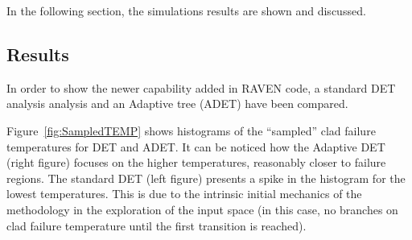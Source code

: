 In the following section, the simulations results are shown and discussed.
\subsection{Results}
In order to show the newer capability added in RAVEN code, a standard DET~\cite{alfonsiPSA,DETmilestone2013} analysis analysis and an Adaptive tree (ADET) have been compared.

Figure~\ref{fig:SampledTEMP} shows histograms of the “sampled” clad failure temperatures for DET and ADET. It can be noticed how the Adaptive DET (right figure) focuses on the higher temperatures, reasonably closer to failure regions. The standard DET (left figure) presents a spike in the histogram for the lowest temperatures. This is due to the intrinsic initial mechanics of the methodology in the exploration of the input space (in this case, no branches on clad failure temperature until the first transition is reached).

